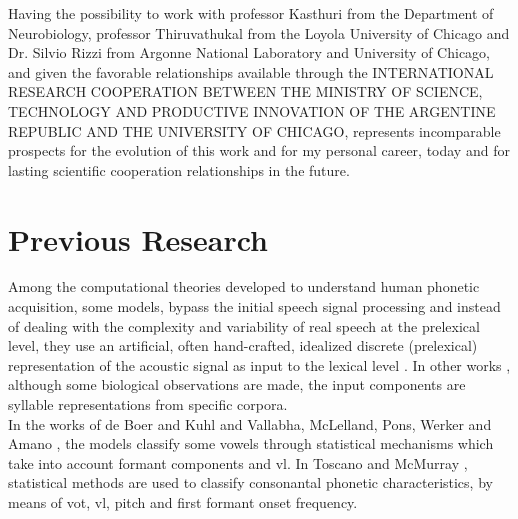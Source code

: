 \documentclass[11pt,a4paper]{article}
\begin{document}
Having the possibility to work with professor
Kasthuri from the Department of Neurobiology,
professor Thiruvathukal from the  Loyola University of Chicago and
Dr. Silvio Rizzi from Argonne National Laboratory and University of Chicago,
and given the favorable relationships available through the
INTERNATIONAL RESEARCH COOPERATION BETWEEN THE MINISTRY OF SCIENCE,
TECHNOLOGY AND PRODUCTIVE INNOVATION
OF THE ARGENTINE REPUBLIC
AND
THE UNIVERSITY OF CHICAGO,
represents incomparable prospects for the
evolution of this work and for my personal career,
today and for lasting scientific cooperation
relationships in the future. \\

























\section{Previous Research}

Among the computational theories developed to understand
human phonetic acquisition, some models, bypass the initial
speech signal processing and
instead of dealing with the complexity and variability of real speech
at the prelexical  level, they use an artificial, often hand-crafted, 
idealized discrete (prelexical) representation of the acoustic
signal as input to the lexical level \cite{scharenborg_2010}.
In other works \cite{dominey_2000}, although some biological observations are made,
the input components are syllable representations from specific corpora.\\

In the works of de Boer and Kuhl \cite{boer_2003} and Vallabha, McLelland, Pons,
Werker and Amano \cite{vallabha_2007}, the models classify some vowels
through statistical mechanisms which take into account formant components
and \gls{vl}.
In Toscano and McMurray \cite{toscano_2010},
statistical methods are used to classify consonantal phonetic
characteristics, by means of \gls{vot},
\gls{vl}, pitch and first formant onset frequency. \\
\end{document}
